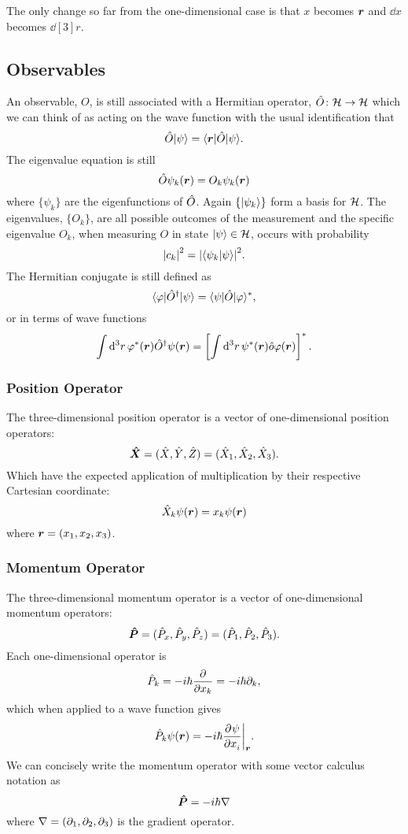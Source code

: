     The only change so far from the one-dimensional case is that \(x\) becomes \(\bm{r}\) and \(\dd{x}\) becomes \(\dd[3]{r}\).
    
    \subsection{Observables}
    An observable, \(O\), is still associated with a Hermitian operator, \(\hat{O}\colon\mathcal{H}\to\mathcal{H}\) which we can think of as acting on the wave function with the usual identification that
    \[\hat{O}\vert {\psi} \rangle = \langle {\bm{r}} \vert\hat{O}\vert {\psi} \rangle.\]
    The eigenvalue equation is still
    \[\hat{O}\psi_k(\bm{r}) = O_k\psi_k(\bm{r})\]
    where \(\{\psi_k\}\) are the eigenfunctions of \(\hat{O}\).
    Again \(\{\vert {\psi_k} \rangle\}\) form a basis for \(\mathcal{H}\).
    The eigenvalues, \(\{O_k\}\), are all possible outcomes of the measurement and the specific eigenvalue \(O_k\), when measuring \(O\) in state \(\vert {\psi} \rangle\in\mathcal{H}\), occurs with probability
    \[\abs{c_k}^2 = \abs{\langle {\psi_k} \vert {\psi} \rangle}^2.\]
    The Hermitian conjugate is still defined as
    \[\langle {\varphi} \vert\hat{O}^\dagger\vert {\psi} \rangle = \langle {\psi} \vert\hat{O}\vert {\varphi} \rangle^*,\]
    or in terms of wave functions
    \[\int \dd[3]{r} \varphi^*(\bm{r})\hat{O}^\dagger \psi(\bm{r}) = \left[\int \dd[3]{r} \psi^*(\bm{r}) \hat{o} \varphi(\bm{r})\right]^*.\]
    
    \subsubsection{Position Operator}
    The three-dimensional position operator is a vector of one-dimensional position operators:
    \[\bm{\hat{X}} = (\hat{X}, \hat{Y}, \hat{Z}) = (\hat{X}_1, \hat{X}_2, \hat{X}_3).\]
    Which have the expected application of multiplication by their respective Cartesian coordinate:
    \[\hat{X}_k \psi(\bm{r}) = x_k\psi(\bm{r})\]
    where \(\bm{r} = (x_1, x_2, x_3)\).
    
    \subsubsection{Momentum Operator}
    The three-dimensional momentum operator is a vector of one-dimensional momentum operators:
    \[\bm{\hat{P}} = (\hat{P}_x, \hat{P}_y, \hat{P}_z) = (\hat{P}_1, \hat{P}_2, \hat{P}_3).\]
    Each one-dimensional operator is
    \[\hat{P}_k = -i\hbar\pdv{x_k} = -i\hbar\partial_k,\]
    which when applied to a wave function gives
    \[\hat{P}_k\psi(\bm{r}) = -i\hbar\pdv[]{\psi}{x_i}\biggr|_{\bm{r}}.\]
    We can concisely write the momentum operator with some vector calculus notation as
    \[\bm{\hat{P}} = -i\hbar\nabla\]
    where \(\nabla = (\partial_1, \partial_2, \partial_3)\) is the gradient operator.
    
